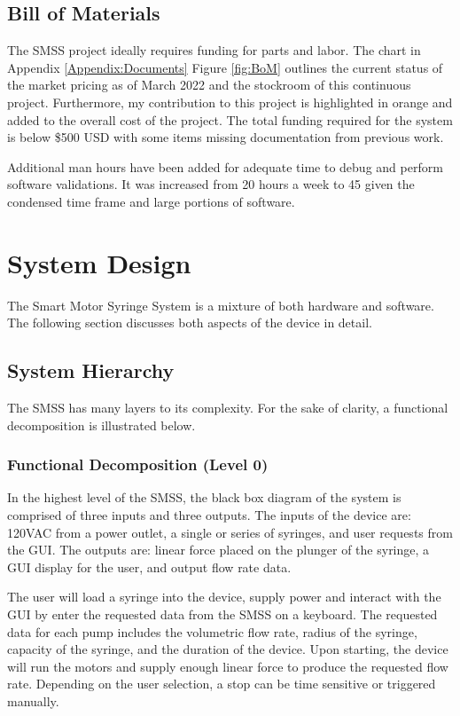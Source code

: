 \documentclass[journal]{IEEEtran}
\begin{document}
        
    \subsection{Bill of Materials}
        The SMSS project ideally requires funding for parts and labor. The chart in Appendix \ref{Appendix:Documents} Figure \ref{fig:BoM} outlines the current status of the market pricing as of March 2022 and the stockroom of this continuous project. Furthermore, my contribution to this project is highlighted in orange and added to the overall cost of the project. The total funding required for the system is below \$500 USD with some items missing documentation from previous work.

        Additional man hours have been added for adequate time to debug and perform software validations. It was increased from 20 hours a week to 45 given the condensed time frame and large portions of software. 
        

\section{System Design}
    The Smart Motor Syringe System is a mixture of both hardware and software. The following section discusses both aspects of the device in detail.
    
    \subsection{System Hierarchy}
        The SMSS has many layers to its complexity. For the sake of clarity, a functional decomposition is illustrated below.
        
        \subsubsection{Functional Decomposition (Level 0) }
            In the highest level of the SMSS, the black box diagram of the system is comprised of three inputs and three outputs. The inputs of the device are: 120VAC from a power outlet, a single or series of syringes, and user requests from the GUI. The outputs are: linear force placed on the plunger of the syringe, a GUI display for the user, and output flow rate data. 
            
            The user will load a syringe into the device, supply power and interact with the GUI by enter the requested data from the SMSS on a keyboard. The requested data for each pump includes the volumetric flow rate, radius of the syringe, capacity of the syringe, and the duration of the device. Upon starting, the device will run the motors and supply enough linear force to produce the requested flow rate. Depending on the user selection, a stop can be time sensitive or triggered manually. 
            
\end{document}
